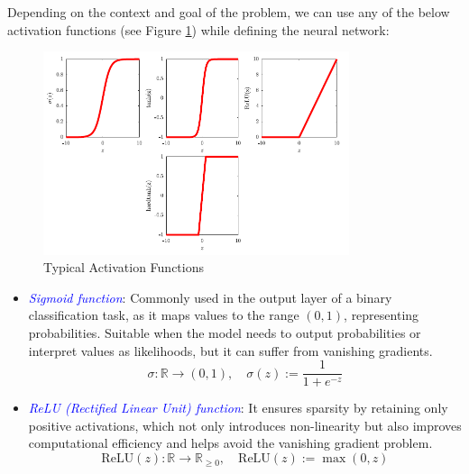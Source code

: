 \begin{example}
Depending on the context and goal of the problem, we can use any of the below activation functions (see Figure \ref{fig:7}) while defining the neural network:

\begin{figure}[h!]
    \centering
    \includegraphics[width=0.8\textwidth]{images/figure7.png}
    \caption{Typical Activation Functions}
    \label{fig:7}
\end{figure}

\begin{itemize}
    \item \textcolor{blue}{\emph{Sigmoid function}}: Commonly used in the output layer of a binary classification task, as it maps values to the range $(0, 1)$, representing probabilities. Suitable when the model needs to output probabilities or interpret values as likelihoods, but it can suffer from vanishing gradients.\cite{hochreiter1997lstm, rumelhart1986learning}
    \begin{equation}
        \sigma: \mathbb{R} \to (0,1), \quad \sigma(z) := \frac{1}{1+e^{-z}}
        \label{eqn:33}
    \end{equation}
    
    \item \textcolor{blue}{\emph{ReLU (Rectified Linear Unit) function}}: It ensures sparsity by retaining only positive activations, which not only introduces non-linearity but also improves computational efficiency and helps avoid the vanishing gradient problem.\cite{nair2010relu}
    \begin{equation}
        \text{ReLU}(z): \mathbb{R} \to \mathbb{R}_{\geq 0}, \quad \text{ReLU}(z) := \max(0, z)
        \label{eqn:34}
    \end{equation}
    

\end{itemize}
\end{example}
